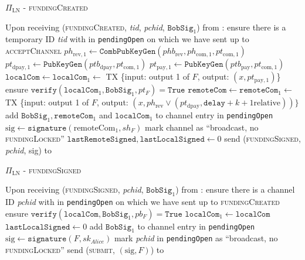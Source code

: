 \begin{protocolbox}{$\Pi_{\mathrm{LN}}$ - \textsc{fundingCreated}}
  \label{alg:protocol:open:fundingCreated}
  \begin{algorithmic}[1]
    \State Upon receiving (\textsc{fundingCreated}, \textit{tid},
    \textit{pchid}, $\mathtt{BobSig}_1$) from \bob:
    \Indent
      \State ensure there is a temporary ID \textit{tid} with \bob{} in
      \texttt{pendingOpen} on which we have sent up to \textsc{acceptChannel}
      \State $ph_{\mathrm{rev}, 1} \gets
      \mathtt{CombPubKeyGen}\left(phb_{\mathrm{rev}}, ph_{\mathrm{com}, 1},
      pt_{\mathrm{com}, 1}\right)$
      \State $pt_{\mathrm{dpay}, 1} \gets
      \texttt{PubKeyGen}\left(ptb_{\mathrm{dpay}}, pt_{\mathrm{com}, 1}\right)$
      \State $pt_{\mathrm{pay}, 1} \gets
      \texttt{PubKeyGen}\left(ptb_{\mathrm{pay}}, pt_{\mathrm{com}, 1}\right)$
      \State $\mathtt{localCom} \gets \mathtt{localCom}_1 \gets$ TX \{input:
      output 1 of $F$, output: $\left(x, pt_{\mathrm{pay}, 1}\right)$\}
      \State ensure $\mathtt{verify}\left(\mathtt{localCom}_1,
      \mathtt{BobSig}_1, pt_F\right) = \mathtt{True}$
      \State $\mathtt{remoteCom} \gets \mathtt{remoteCom}_1 \gets$ TX \{input:
      output 1 of $F$, output: $\left(x, ph_{\mathrm{rev}} \vee
      \left(pt_{\mathrm{dpay}}, \mathtt{delay} + k + 1 \text{
      relative}\right)\right)\}$
      \State add $\mathtt{BobSig}_1, \mathtt{remoteCom}_1$ and
      $\mathtt{localCom}_1$ to channel entry in \texttt{pendingOpen}
      \State $\mathrm{sig} \gets \mathtt{signature}\left(\mathrm{remoteCom}_1,
      sh_F\right)$
      \State mark channel as ``broadcast, no \textsc{fundingLocked}''
      \State $\mathtt{lastRemoteSigned}, \mathtt{lastLocalSigned} \gets 0$
      \State send (\textsc{fundingSigned}, \textit{pchid}, sig) to \bob{}
    \EndIndent
  \end{algorithmic}
\end{protocolbox}

\begin{protocolbox}{$\Pi_{\mathrm{LN}}$ - \textsc{fundingSigned}}
  \label{alg:protocol:open:fundingSigned}
  \begin{algorithmic}[1]
    \State Upon receiving (\textsc{fundingSigned}, \textit{pchid},
    $\mathtt{BobSig}_1$) from \bob:
    \Indent
      \State ensure there is a channel ID \textit{pchid} with \bob{} in
      \texttt{pendingOpen} on which we have sent up to \textsc{fundingCreated}
      \State ensure $\mathtt{verify}\left(\mathtt{localCom}, \mathtt{BobSig}_1,
      pb_F\right) = \mathtt{True}$
      \State $\mathtt{localCom}_1 \gets \mathtt{localCom}$
      \State $\mathtt{lastLocalSigned} \gets 0$
      \State add $\mathtt{BobSig}_1$ to channel entry in \texttt{pendingOpen}
      \State $\mathrm{sig} \gets \mathtt{signature}\left(F,
      sk_{\mathit{Alice}}\right)$
      \State mark \textit{pchid} in \texttt{pendingOpen} as ``broadcast, no
      \textsc{fundingLocked}''
      \State send (\textsc{submit}, $\left(\mathrm{sig}, F\right)$) to \ledger
    \EndIndent
  \end{algorithmic}
\end{protocolbox}


